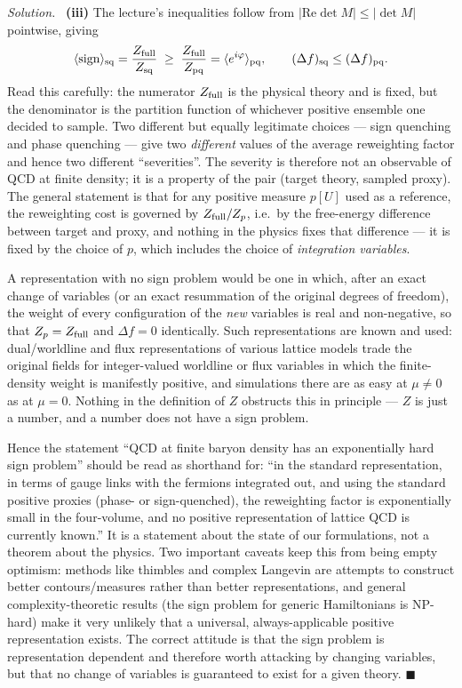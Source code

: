\documentclass[11pt]{article}
\newenvironment{solution}{\par\smallskip\noindent\textit{Solution.}\ }{\hfill$\blacksquare$\par\smallskip}
\begin{document}
\begin{solution}
\textbf{(iii)} The lecture's inequalities follow from $|\mathrm{Re}\det M| \le |\det M|$ pointwise, giving
\begin{equation}
\langle \mathrm{sign}\rangle_{\rm sq} = \frac{Z_{\rm full}}{Z_{\rm sq}} \;\ge\; \frac{Z_{\rm full}}{Z_{\rm pq}} = \langle e^{i\varphi}\rangle_{\rm pq},
\qquad (\Delta f)_{\rm sq} \le (\Delta f)_{\rm pq}.
\end{equation}
Read this carefully: the numerator $Z_{\rm full}$ is the physical theory and is fixed, but the denominator is the partition function of whichever positive ensemble one decided to sample. Two different but equally legitimate choices --- sign quenching and phase quenching --- give two \emph{different} values of the average reweighting factor and hence two different ``severities''. The severity is therefore not an observable of QCD at finite density; it is a property of the pair (target theory, sampled proxy). The general statement is that for any positive measure $p[U]$ used as a reference, the reweighting cost is governed by $Z_{\rm full}/Z_p$, i.e.\ by the free-energy difference between target and proxy, and nothing in the physics fixes that difference --- it is fixed by the choice of $p$, which includes the choice of \emph{integration variables}.

A representation with no sign problem would be one in which, after an exact change of variables (or an exact resummation of the original degrees of freedom), the weight of every configuration of the \emph{new} variables is real and non-negative, so that $Z_p = Z_{\rm full}$ and $\Delta f = 0$ identically. Such representations are known and used: dual/worldline and flux representations of various lattice models trade the original fields for integer-valued worldline or flux variables in which the finite-density weight is manifestly positive, and simulations there are as easy at $\mu \ne 0$ as at $\mu = 0$. Nothing in the definition of $Z$ obstructs this in principle --- $Z$ is just a number, and a number does not have a sign problem.

Hence the statement ``QCD at finite baryon density has an exponentially hard sign problem'' should be read as shorthand for: ``in the standard representation, in terms of gauge links with the fermions integrated out, and using the standard positive proxies (phase- or sign-quenched), the reweighting factor is exponentially small in the four-volume, and no positive representation of lattice QCD is currently known.'' It is a statement about the state of our formulations, not a theorem about the physics. Two important caveats keep this from being empty optimism: methods like thimbles and complex Langevin are attempts to construct better contours/measures rather than better representations, and general complexity-theoretic results (the sign problem for generic Hamiltonians is NP-hard) make it very unlikely that a universal, always-applicable positive representation exists. The correct attitude is that the sign problem is representation dependent and therefore worth attacking by changing variables, but that no change of variables is guaranteed to exist for a given theory.
\end{solution}
\end{document}
